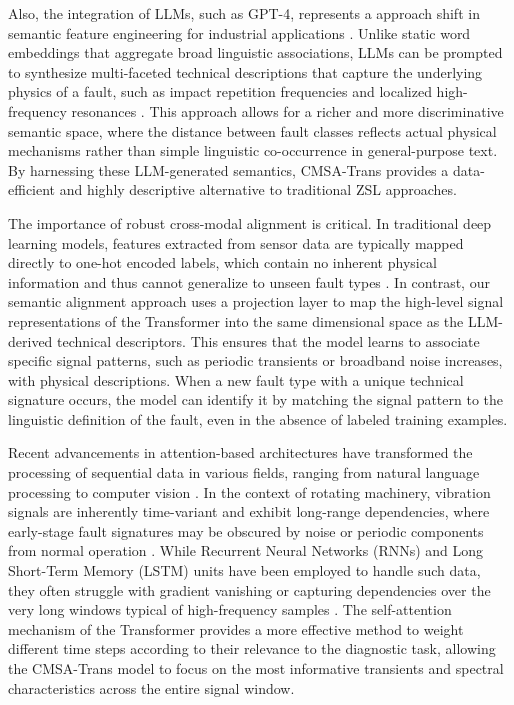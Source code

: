 Also, the integration of LLMs, such as GPT-4, represents a approach shift in semantic feature engineering for industrial applications \cite{bubeck2023sparks}. Unlike static word embeddings that aggregate broad linguistic associations, LLMs can be prompted to synthesize multi-faceted technical descriptions that capture the underlying physics of a fault, such as impact repetition frequencies and localized high-frequency resonances \cite{brown2020language}. This approach allows for a richer and more discriminative semantic space, where the distance between fault classes reflects actual physical mechanisms rather than simple linguistic co-occurrence in general-purpose text. By harnessing these LLM-generated semantics, CMSA-Trans provides a data-efficient and highly descriptive alternative to traditional ZSL approaches.

The importance of robust cross-modal alignment is critical. In traditional deep learning models, features extracted from sensor data are typically mapped directly to one-hot encoded labels, which contain no inherent physical information and thus cannot generalize to unseen fault types \cite{goodfellow2016deep, lecun2015deep}. In contrast, our semantic alignment approach uses a projection layer to map the high-level signal representations of the Transformer into the same dimensional space as the LLM-derived technical descriptors. This ensures that the model learns to associate specific signal patterns, such as periodic transients or broadband noise increases, with physical descriptions. When a new fault type with a unique technical signature occurs, the model can identify it by matching the signal pattern to the linguistic definition of the fault, even in the absence of labeled training examples.

Recent advancements in attention-based architectures have transformed the processing of sequential data in various fields, ranging from natural language processing to computer vision \cite{devlin2018bert, dosovitskiy2020image}. In the context of rotating machinery, vibration signals are inherently time-variant and exhibit long-range dependencies, where early-stage fault signatures may be obscured by noise or periodic components from normal operation \cite{zhang2021attention}. While Recurrent Neural Networks (RNNs) and Long Short-Term Memory (LSTM) units have been employed to handle such data, they often struggle with gradient vanishing or capturing dependencies over the very long windows typical of high-frequency samples \cite{hochreiter1997long}. The self-attention mechanism of the Transformer provides a more effective method to weight different time steps according to their relevance to the diagnostic task, allowing the CMSA-Trans model to focus on the most informative transients and spectral characteristics across the entire signal window.

